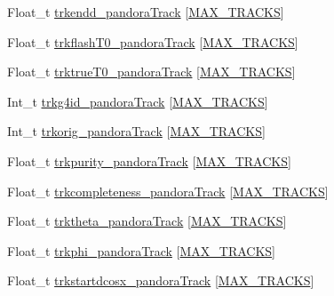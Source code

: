\begin{DoxyCompactItemize}
\item 
Float\-\_\-t \hyperlink{classanatree_a7d2564f9236dcb1f4e46a12f8c1c3718}{trkendd\-\_\-pandora\-Track} \mbox{[}\hyperlink{anatree__core__v09410002_8h_a327fd4e796e4a0d78947524c96e4362e}{M\-A\-X\-\_\-\-T\-R\-A\-C\-K\-S}\mbox{]}
\item 
Float\-\_\-t \hyperlink{classanatree_a0d362559e2753b7fea4325c329652bbc}{trkflash\-T0\-\_\-pandora\-Track} \mbox{[}\hyperlink{anatree__core__v09410002_8h_a327fd4e796e4a0d78947524c96e4362e}{M\-A\-X\-\_\-\-T\-R\-A\-C\-K\-S}\mbox{]}
\item 
Float\-\_\-t \hyperlink{classanatree_a2f8def2074189a5c4ca452123bfdb752}{trktrue\-T0\-\_\-pandora\-Track} \mbox{[}\hyperlink{anatree__core__v09410002_8h_a327fd4e796e4a0d78947524c96e4362e}{M\-A\-X\-\_\-\-T\-R\-A\-C\-K\-S}\mbox{]}
\item 
Int\-\_\-t \hyperlink{classanatree_a3f305344ffa47d19d64ba4191b7b4295}{trkg4id\-\_\-pandora\-Track} \mbox{[}\hyperlink{anatree__core__v09410002_8h_a327fd4e796e4a0d78947524c96e4362e}{M\-A\-X\-\_\-\-T\-R\-A\-C\-K\-S}\mbox{]}
\item 
Int\-\_\-t \hyperlink{classanatree_a042a0c394e2ef31d4a0c98b35742eaaf}{trkorig\-\_\-pandora\-Track} \mbox{[}\hyperlink{anatree__core__v09410002_8h_a327fd4e796e4a0d78947524c96e4362e}{M\-A\-X\-\_\-\-T\-R\-A\-C\-K\-S}\mbox{]}
\item 
Float\-\_\-t \hyperlink{classanatree_a67264ab449821d6add354177992fda96}{trkpurity\-\_\-pandora\-Track} \mbox{[}\hyperlink{anatree__core__v09410002_8h_a327fd4e796e4a0d78947524c96e4362e}{M\-A\-X\-\_\-\-T\-R\-A\-C\-K\-S}\mbox{]}
\item 
Float\-\_\-t \hyperlink{classanatree_ae61e5564601170300a2631b20ac7de0d}{trkcompleteness\-\_\-pandora\-Track} \mbox{[}\hyperlink{anatree__core__v09410002_8h_a327fd4e796e4a0d78947524c96e4362e}{M\-A\-X\-\_\-\-T\-R\-A\-C\-K\-S}\mbox{]}
\item 
Float\-\_\-t \hyperlink{classanatree_a19cf8542bace3df2c75c84fd1a9f79a3}{trktheta\-\_\-pandora\-Track} \mbox{[}\hyperlink{anatree__core__v09410002_8h_a327fd4e796e4a0d78947524c96e4362e}{M\-A\-X\-\_\-\-T\-R\-A\-C\-K\-S}\mbox{]}
\item 
Float\-\_\-t \hyperlink{classanatree_a461c0ab2f9a673d271f39c309d30c1cc}{trkphi\-\_\-pandora\-Track} \mbox{[}\hyperlink{anatree__core__v09410002_8h_a327fd4e796e4a0d78947524c96e4362e}{M\-A\-X\-\_\-\-T\-R\-A\-C\-K\-S}\mbox{]}
\item 
Float\-\_\-t \hyperlink{classanatree_a2a476447fc959e075cf018e75f1e676e}{trkstartdcosx\-\_\-pandora\-Track} \mbox{[}\hyperlink{anatree__core__v09410002_8h_a327fd4e796e4a0d78947524c96e4362e}{M\-A\-X\-\_\-\-T\-R\-A\-C\-K\-S}\mbox{]}

\end{DoxyCompactItemize}

